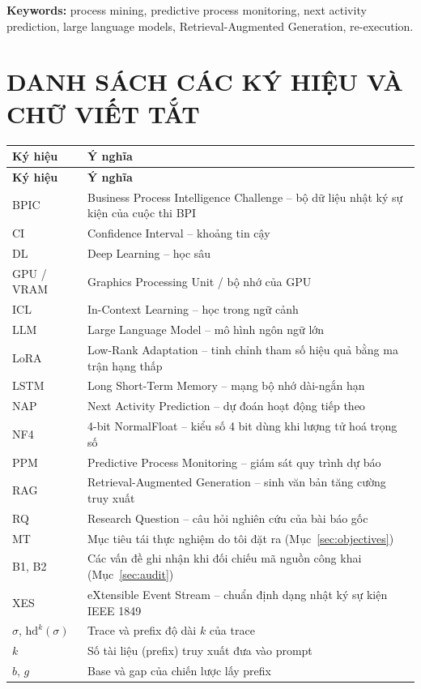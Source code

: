 \documentclass[a4paper,12pt,oneside]{report}
\begin{document}
\vspace{0.5cm}
\noindent\textbf{Keywords:} process mining, predictive process monitoring, next activity prediction, large language models, Retrieval-Augmented Generation, re-execution.

\clearpage
{}
\tableofcontents
\clearpage
{}
\listoffigures
\clearpage
{}
\listoftables
\clearpage

\chapter*{DANH SÁCH CÁC KÝ HIỆU VÀ CHỮ VIẾT TẮT}

\begin{longtable}{@{}L{3cm}L{12cm}@{}}
\toprule
\textbf{Ký hiệu} & \textbf{Ý nghĩa} \\
\midrule
\endfirsthead
\toprule
\textbf{Ký hiệu} & \textbf{Ý nghĩa} \\
\midrule
\endhead
\bottomrule
\endfoot
BPIC & Business Process Intelligence Challenge -- bộ dữ liệu nhật ký sự kiện của cuộc thi BPI \\
CI & Confidence Interval -- khoảng tin cậy \\
DL & Deep Learning -- học sâu \\
GPU / VRAM & Graphics Processing Unit / bộ nhớ của GPU \\
ICL & In-Context Learning -- học trong ngữ cảnh \\
LLM & Large Language Model -- mô hình ngôn ngữ lớn \\
LoRA & Low-Rank Adaptation -- tinh chỉnh tham số hiệu quả bằng ma trận hạng thấp \\
LSTM & Long Short-Term Memory -- mạng bộ nhớ dài-ngắn hạn \\
NAP & Next Activity Prediction -- dự đoán hoạt động tiếp theo \\
NF4 & 4-bit NormalFloat -- kiểu số 4 bit dùng khi lượng tử hoá trọng số \\
PPM & Predictive Process Monitoring -- giám sát quy trình dự báo \\
RAG & Retrieval-Augmented Generation -- sinh văn bản tăng cường truy xuất \\
RQ & Research Question -- câu hỏi nghiên cứu của bài báo gốc \\
MT & Mục tiêu tái thực nghiệm do tôi đặt ra (Mục~\ref{sec:objectives}) \\
B1, B2 & Các vấn đề ghi nhận khi đối chiếu mã nguồn công khai (Mục~\ref{sec:audit}) \\
XES & eXtensible Event Stream -- chuẩn định dạng nhật ký sự kiện IEEE 1849 \\
$\sigma$, $\mathrm{hd}^k(\sigma)$ & Trace và prefix độ dài $k$ của trace \\
$k$ & Số tài liệu (prefix) truy xuất đưa vào prompt \\
$b$, $g$ & Base và gap của chiến lược lấy prefix \\
\end{longtable}
\end{document}

